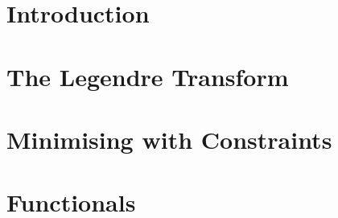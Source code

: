 \documentclass[british,11pt,a4paper]{report}
\begin{document}
\maketitle
\tableofcontents
\chapter{Introduction}

\chapter{The Legendre Transform}

\chapter{Minimising with Constraints}

\chapter{Functionals}

\end{document}
